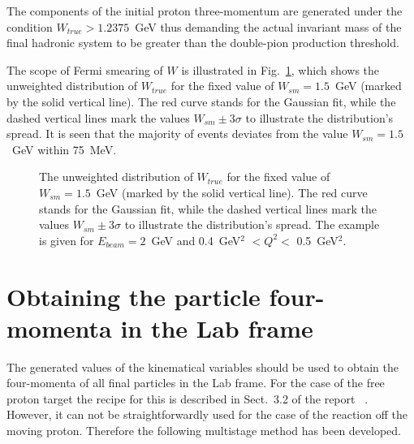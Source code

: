 The components of the initial proton three-momentum are generated under the condition $W_{true}>1.2375$~GeV thus demanding the actual invariant mass of the final hadronic system to be greater than the double-pion production threshold.



The scope of Fermi smearing of $W$ is illustrated in Fig.~\ref{fig:w_smear}, which shows the unweighted distribution of $W_{true}$ for the fixed value of $W_{sm} =1.5$~GeV (marked by the solid vertical line). The red curve stands for the Gaussian fit, while the dashed vertical lines mark the values $W_{sm}\pm3\sigma$ to illustrate the distribution's spread. It is seen that the majority of events deviates from the value $W_{sm} =1.5$~GeV within 75~MeV.
\begin{figure}[!ht]
\begin{center}
\end{center}
\caption{\small The unweighted distribution of $W_{true}$ for the fixed value of $W_{sm} =1.5$~GeV (marked by the solid vertical line). The red curve stands for the Gaussian fit, while the dashed vertical lines mark the values $W_{sm}\pm3\sigma$ to illustrate the distribution's spread. The example is given for $E_{beam} = 2$~GeV and 0.4~GeV$^2$ $< Q^{2}<$ 0.5~GeV$^2$.}
\label{fig:w_smear}
\end{figure}






\section{Obtaining the particle four-momenta in the Lab frame}


The generated values of the kinematical variables should be used to obtain the four-momenta of all final particles in the Lab frame. For the case of the free proton target the recipe for this is described in Sect.~3.2 of the report~\cite{twopeg} . However, it can not be straightforwardly used for the case of the reaction off the moving proton. Therefore the following multistage method has been developed.


